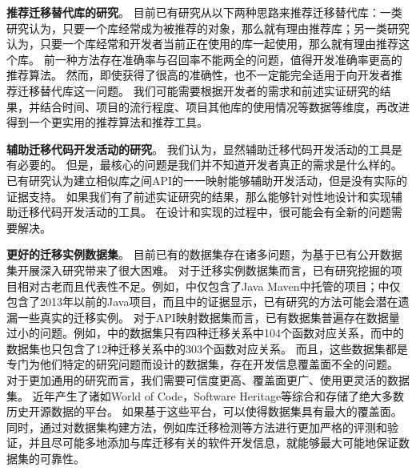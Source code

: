 \documentclass[UTF8]{ctexart}
\begin{document}
\textbf{推荐迁移替代库的研究}。
目前已有研究从以下两种思路来推荐迁移替代库：一类研究认为，只要一个库经常成为被推荐的对象，那么就有理由推荐库\cite{2012WCRE-Teyton-Mining, 2014JournalOfSysAndSoft-Teyton-Study}；另一类研究认为，只要一个库经常和开发者当前正在使用的库一起使用，那么就有理由推荐这个库\cite{2017InfoSciAndTech-Ouni-Search, 2013WCRE-Thung-Automated}。
前一种方法存在准确率与召回率不能两全的问题，值得开发准确率更高的推荐算法。
然而，即使获得了很高的准确性，也不一定能完全适用于向开发者推荐迁移替代库这一问题。
我们可能需要根据开发者的需求和前述实证研究的结果，并结合时间、项目的流行程度、项目其他库的使用情况等数据等维度，再改进得到一个更实用的推荐算法和推荐工具。

\textbf{辅助迁移代码开发活动的研究}。
我们认为，显然辅助迁移代码开发活动的工具是有必要的。
但是，最核心的问题是我们并不知道开发者真正的需求是什么样的。
已有研究认为建立相似库之间API的一一映射能够辅助开发活动，但是没有实际的证据支持\cite{2013WCRE-Teyton-Automatic, 2019ICPC-Alrubaye-On, 2019Arxiv-Alrubaye-Learning}。
如果我们有了前述实证研究的结果，那么能够针对性地设计和实现辅助迁移代码开发活动的工具。
在设计和实现的过程中，很可能会有全新的问题需要解决。

\textbf{更好的迁移实例数据集}。
目前已有的数据集存在诸多问题，为基于已有公开数据集开展深入研究带来了很大困难。
对于迁移实例数据集而言，已有研究挖掘的项目相对古老而且代表性不足。例如，\cite{2012WCRE-Teyton-Mining}中仅包含了Java Maven中托管的项目；\cite{2019ICPC-Alrubaye-On}中仅包含了2013年以前的Java项目\cite{2013MSR-Allamanis-Mining}，而且\cite{2019ICSME-Alrubaye-MigrationMiner}中的证据显示，已有研究的方法可能会潜在遗漏一些真实的迁移实例。
对于API映射数据集而言，已有数据集普遍存在数据量过小的问题。例如，\cite{2013WCRE-Teyton-Automatic}中的数据集只有四种迁移关系中104个函数对应关系，而\cite{2019ICPC-Alrubaye-On}中的数据集也只包含了12种迁移关系中的303个函数对应关系。
而且，这些数据集都是专门为他们特定的研究问题而设计的数据集，存在开发信息覆盖面不全的问题。
对于更加通用的研究而言，我们需要可信度更高、覆盖面更广、使用更灵活的数据集。
近年产生了诸如World of Code，Software Heritage等综合和存储了绝大多数历史开源数据的平台\cite{2019MSR-Pietri-SoftwareHeritage, 2019MSR-Ma-WorldOfCode}。
如果基于这些平台，可以使得数据集具有最大的覆盖面。
同时，通过对数据集构建方法，例如库迁移检测等方法进行更加严格的评测和验证，并且尽可能多地添加与库迁移有关的软件开发信息，就能够最大可能地保证数据集的可靠性。
\end{document}

